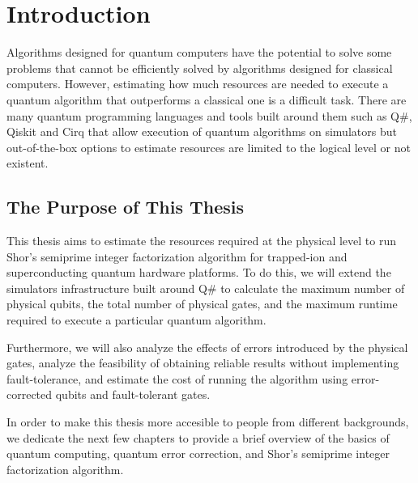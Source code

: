%
%
\chapter {Introduction}

Algorithms designed for quantum computers have the potential to solve some problems that cannot be efficiently solved by algorithms designed for classical computers. However, estimating how much resources are needed to execute a quantum algorithm that outperforms a classical one is a difficult task. There are many quantum programming languages and tools built around them such as Q\#\cite{QSharp_Svore_2018}, Qiskit\cite{Qiskit_2021} and Cirq\cite{Cirq_2021} that allow execution of quantum algorithms on simulators but out-of-the-box options to estimate resources are limited to the logical level or not existent.

\section{The Purpose of This Thesis}

This thesis aims to estimate the resources required at the physical level to run Shor's semiprime integer factorization algorithm for trapped-ion and superconducting quantum hardware platforms. To do this, we will extend the simulators infrastructure built around Q\# to calculate the maximum number of physical qubits, the total number of physical gates, and the maximum runtime required to execute a particular quantum algorithm. 

Furthermore, we will also analyze the effects of errors introduced by the physical gates, analyze the feasibility of obtaining reliable results without implementing fault-tolerance, and estimate the cost of running the algorithm using error-corrected qubits and fault-tolerant gates.

In order to make this thesis more accesible to people from different backgrounds, we dedicate the next few chapters to provide a brief overview of the basics of quantum computing, quantum error correction, and Shor's semiprime integer factorization algorithm.
